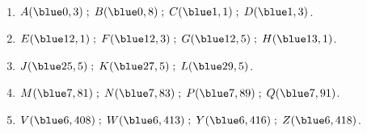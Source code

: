  \begin{corrige}
   \ \\ [-5mm]
   \begin{enumerate}
      \item $A({\blue 0,3}) \; ; \; B({\blue 0,8}) \; ; \; C({\blue 1,1}) \; ; \; D({\blue 1,3})$.
      \item $E({\blue 12,1}) \; ; \; F({\blue 12,3}) \; ; \; G({\blue 12,5}) \; ; \; H({\blue 13,1})$.
      \item $J({\blue 25,5}) \; ; \; K({\blue 27,5}) \; ; \; L({\blue 29,5})$.
      \item $M({\blue 7,81}) \; ; \; N({\blue 7,83}) \; ; \; P({\blue 7,89}) \; ; \; Q({\blue 7,91})$.
      \item $V({\blue 6,408}) \; ; \; W({\blue 6,413}) \; ; \; Y({\blue 6,416}) \; ; \; Z({\blue 6,418})$.
   \end{enumerate}
 \end{corrige}
